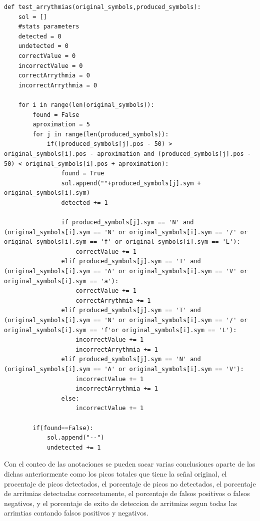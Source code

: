 \lstset{language=python, breaklines=true, basicstyle=\footnotesize}
\begin{lstlisting}[frame=single]
def test_arrythmias(original_symbols,produced_symbols):
    sol = []
    #stats parameters
    detected = 0
    undetected = 0
    correctValue = 0
    incorrectValue = 0
    correctArrythmia = 0
    incorrectArrythmia = 0
    
    for i in range(len(original_symbols)):
        found = False
        aproximation = 5
        for j in range(len(produced_symbols)):
            if((produced_symbols[j].pos - 50) > original_symbols[i].pos - aproximation and (produced_symbols[j].pos - 50) < original_symbols[i].pos + aproximation):
                found = True
                sol.append(""+produced_symbols[j].sym + original_symbols[i].sym)
                detected += 1
                
                if produced_symbols[j].sym == 'N' and (original_symbols[i].sym == 'N' or original_symbols[i].sym == '/' or original_symbols[i].sym == 'f' or original_symbols[i].sym == 'L'):
                    correctValue += 1
                elif produced_symbols[j].sym == 'T' and (original_symbols[i].sym == 'A' or original_symbols[i].sym == 'V' or original_symbols[i].sym == 'a'):
                    correctValue += 1
                    correctArrythmia += 1
                elif produced_symbols[j].sym == 'T' and (original_symbols[i].sym == 'N' or original_symbols[i].sym == '/' or original_symbols[i].sym == 'f'or original_symbols[i].sym == 'L'):
                    incorrectValue += 1
                    incorrectArrythmia += 1
                elif produced_symbols[j].sym == 'N' and (original_symbols[i].sym == 'A' or original_symbols[i].sym == 'V'):
                    incorrectValue += 1
                    incorrectArrythmia += 1
                else:
                    incorrectValue += 1
                
        if(found==False):
            sol.append("--")
            undetected += 1
\end{lstlisting}

Con el conteo de las anotaciones se pueden sacar varias conclusiones aparte de las dichas 
anteriormente como los picos totales que tiene la señal original, el procentaje de picos 
detectados, el porcentaje de picos no detectados, el porcentaje de arritmias detectadas 
correcetamente, el porcentaje de falsos positivos o falsos negativos, y el porcentaje de exito de deteccion de 
arritmias segun todas las arrimtias contando falsos positivos y negativos.

